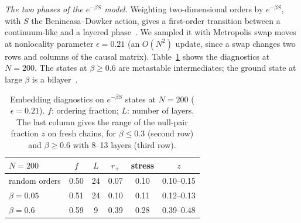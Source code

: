 \documentclass[prd,twocolumn,superscriptaddress,nofootinbib,amsmath,amssymb,floatfix]{revtex4-2}
\begin{document}
\emph{The two phases of the $e^{-\beta S}$ model.} Weighting two-dimensional orders by $e^{-\beta S}$, with $S$ the Benincasa--Dowker action, gives a first-order transition between a continuum-like and a layered phase~\cite{BHS08,Surya12,GOS18}. We sampled it with Metropolis swap moves at nonlocality parameter $\epsilon=0.21$ (an $O(N^2)$ update, since a swap changes two rows and columns of the causal matrix). Table~\ref{tab:phases} shows the diagnostics at $N=200$. The states at $\beta\geq0.6$ are metastable intermediates; the ground state at large $\beta$ is a bilayer~\cite{CunninghamSurya19}.

\begin{table}[t]
\caption{Embedding diagnostics on $e^{-\beta S}$ states at $N=200$ ($\epsilon=0.21$). $f$: ordering fraction; $L$: number of layers. The last column gives the range of the null-pair fraction $z$ on fresh chains, for $\beta\le0.3$ (second row) and $\beta\ge0.6$ with 8--13 layers (third row).}
\label{tab:phases}
\begin{ruledtabular}
\begin{tabular}{lccccc}
$N=200$ & $f$ & $L$ & $r_+$ & stress & $z$\\
\hline
random orders & 0.50 & 24 & 0.07 & 0.10 & 0.10--0.15\\
$\beta=0.05$ & 0.51 & 24 & 0.10 & 0.11 & 0.12--0.13\\
$\beta=0.6$ & 0.59 & 9 & 0.39 & 0.28 & 0.39--0.48\\
\end{tabular}
\end{ruledtabular}
\end{table}
\end{document}
